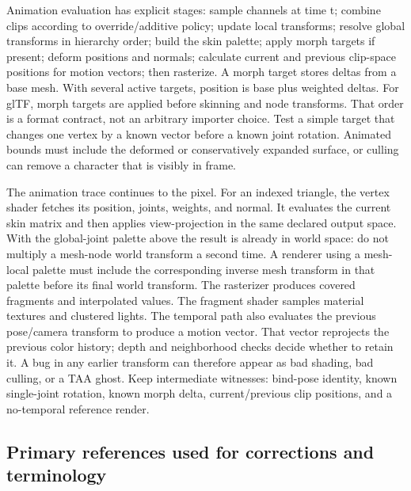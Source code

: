 Animation evaluation has explicit stages: sample channels at time t; combine clips according to override/additive policy; update local transforms; resolve global transforms in hierarchy order; build the skin palette; apply morph targets if present; deform positions and normals; calculate current and previous clip-space positions for motion vectors; then rasterize. A morph target stores deltas from a base mesh. With several active targets, position is base plus weighted deltas. For glTF, morph targets are applied before skinning and node transforms. That order is a format contract, not an arbitrary importer choice. Test a simple target that changes one vertex by a known vector before a known joint rotation. Animated bounds must include the deformed or conservatively expanded surface, or culling can remove a character that is visibly in frame.

The animation trace continues to the pixel. For an indexed triangle, the vertex shader fetches its position, joints, weights, and normal. It evaluates the current skin matrix and then applies view-projection in the same declared output space. With the global-joint palette above the result is already in world space: do not multiply a mesh-node world transform a second time. A renderer using a mesh-local palette must include the corresponding inverse mesh transform in that palette before its final world transform. The rasterizer produces covered fragments and interpolated values. The fragment shader samples material textures and clustered lights. The temporal path also evaluates the previous pose/camera transform to produce a motion vector. That vector reprojects the previous color history; depth and neighborhood checks decide whether to retain it. A bug in any earlier transform can therefore appear as bad shading, bad culling, or a TAA ghost. Keep intermediate witnesses: bind-pose identity, known single-joint rotation, known morph delta, current/previous clip positions, and a no-temporal reference render.

\subsection{Primary references used for corrections and terminology}\label{04-visual-computing-ii-ch037-primary-references-used-for-corrections-and-terminology}

